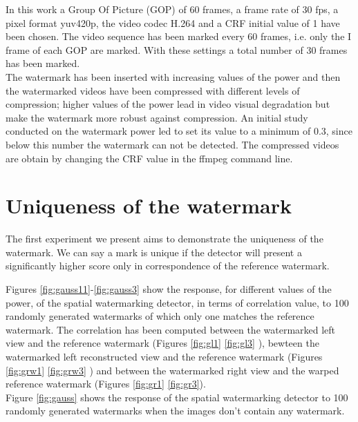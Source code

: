 In this work a Group Of Picture (GOP) of 60 frames, a frame rate of 30 fps, a pixel format yuv420p, the video codec H.264 and a CRF initial value of 1 have been chosen.\newline 
The video sequence has been marked every 60 frames, i.e. only the I frame of each GOP are marked.\newline 
With these settings a total number of 30 frames has been marked.\\
The watermark has been inserted with increasing values of the power and then the watermarked videos have been compressed with different levels of compression; higher values of the power lead in video visual degradation but make the watermark more robust against compression. 
An initial study conducted on the watermark power led to set its value to a minimum of 0.3, since below this number the watermark can not be detected. The compressed videos are obtain by changing the CRF value in the ffmpeg command line.



\section{Uniqueness of the watermark}

The first experiment we present aims to demonstrate the uniqueness of the watermark. We can say a mark is unique if the detector will present a significantly higher score only in correspondence of the reference watermark. 

Figures \ref{fig:gauss11}-\ref{fig:gauss3} show the response, for different values of the power, of the spatial watermarking detector, in terms of correlation value, to 100 randomly generated watermarks of which only one matches the reference watermark. The correlation has been computed between the watermarked left view and the reference watermark (Figures \ref{fig:gl1} \ref{fig:gl3} ), bewteen the watermarked left reconstructed view and the reference watermark (Figures \ref{fig:grw1} \ref{fig:grw3} ) and between the watermarked right view and the warped reference watermark (Figures \ref{fig:gr1} \ref{fig:gr3}).\\
Figure \ref{fig:gauss} shows the response of the spatial watermarking detector to 100 randomly generated watermarks when the images don't contain any watermark. 

